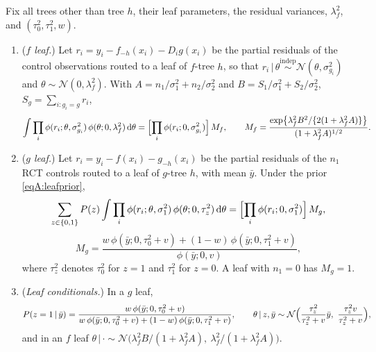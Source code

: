 \documentclass[11pt]{article}
\newcommand{\Normal}{\mathcal{N}}
\newcommand{\given}{\,\vert\,}
\newcommand{\dd}{\mathrm{d}}
\newcommand{\indep}{\stackrel{\text{indep}}{\sim}}
\theoremstyle{definition}
\theoremstyle{plain}
\begin{document}
{\begin{lemA}\label{lem:marg}
Fix all trees other than tree $h$, their leaf parameters, the residual variances, $\lambda_f^2$, and $(\tau_0^2,\tau_1^2,w)$.
\begin{enumerate}[label=(\alph*),leftmargin=2.2em]
\item (\emph{$f$ leaf.}) Let $r_i=y_i-f_{-h}(x_i)-D_ig(x_i)$ be the partial residuals of the control observations routed to a leaf of $f$-tree $h$, so that $r_i\given\theta\indep\Normal(\theta,\sigma^2_{g_i})$ and $\theta\sim\Normal(0,\lambda_f^2)$. With $A=n_1/\sigma_1^2+n_2/\sigma_2^2$ and $B=S_1/\sigma_1^2+S_2/\sigma_2^2$, $S_g=\sum_{i:g_i=g}r_i$,
\begin{equation}
\int\prod_i\phi(r_i;\theta,\sigma^2_{g_i})\,\phi(\theta;0,\lambda_f^2)\,\dd\theta
=\Bigl[\prod_i\phi(r_i;0,\sigma^2_{g_i})\Bigr]\,M_f,\qquad
M_f=\frac{\exp\bigl\{\lambda_f^2B^2/\{2(1+\lambda_f^2A)\}\bigr\}}{(1+\lambda_f^2A)^{1/2}}.
\label{eqA:Mf}
\end{equation}
\item (\emph{$g$ leaf.}) Let $r_i=y_i-f(x_i)-g_{-h}(x_i)$ be the partial residuals of the $n_1$ RCT controls routed to a leaf of $g$-tree $h$, with mean $\bar y$. Under the prior \eqref{eqA:leafprior},
\begin{equation}
\sum_{z\in\{0,1\}}P(z)\int\prod_i\phi(r_i;\theta,\sigma_1^2)\,\phi(\theta;0,\tau_z^2)\,\dd\theta
=\Bigl[\prod_i\phi(r_i;0,\sigma_1^2)\Bigr]\,M_g,
\label{eqA:Mg}
\end{equation}
\begin{equation}
M_g=\frac{w\,\phi(\bar y;0,\tau_0^2+v)+(1-w)\,\phi(\bar y;0,\tau_1^2+v)}{\phi(\bar y;0,v)},
\label{eq:Mg2}
\end{equation}
where $\tau_z^2$ denotes $\tau_0^2$ for $z=1$ and $\tau_1^2$ for $z=0$. A leaf with $n_1=0$ has $M_g=1$.
\item (\emph{Leaf conditionals.}) In a $g$ leaf,
\begin{equation}
P(z=1\given\bar y)=\frac{w\,\phi(\bar y;0,\tau_0^2+v)}{w\,\phi(\bar y;0,\tau_0^2+v)+(1-w)\,\phi(\bar y;0,\tau_1^2+v)},\qquad
\theta\given z,\bar y\sim\Normal\Bigl(\frac{\tau_z^2}{\tau_z^2+v}\bar y,\ \frac{\tau_z^2v}{\tau_z^2+v}\Bigr),
\label{eq:leafcond}
\end{equation}
and in an $f$ leaf $\theta\given\cdot\sim\Normal\bigl(\lambda_f^2B/(1+\lambda_f^2A),\ \lambda_f^2/(1+\lambda_f^2A)\bigr)$.
\end{enumerate}
\end{lemA}

}
\end{document}
